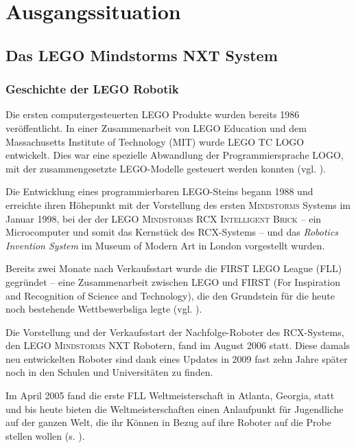 \documentclass[paper=a4, DIV=calc, BCOR=12mm, twoside=on, onecolumn=on, open = right, titlepage =on, parskip =half-, headsepline = on, footsepline = off, chapterprefix = off, appendixprefix = on, fontsize = 12pt, numbers = noenddot, abstract = on]{scrbook}
\begin{document}
\chapter{Ausgangssituation}

\par\singlespacing
\section{Das LEGO Mindstorms NXT System}
\onehalfspacing
\subsection{Geschichte der \textsc{LEGO} Robotik}
Die ersten computergesteuerten \textsc{LEGO} Produkte wurden bereits 1986 veröffentlicht. In einer Zusammenarbeit von \textsc{LEGO} Education und dem Massachusetts Institute of Technology (MIT) wurde \textsc{LEGO TC LOGO} entwickelt. Dies war eine spezielle Abwandlung der Programmiersprache LOGO, mit der zusammengesetzte \textsc{LEGO}-Modelle gesteuert werden konnten (vgl. \cite{rolling:14}).

Die Entwicklung eines programmierbaren \textsc{LEGO}-Steins begann 1988 und erreichte ihren Höhepunkt mit der Vorstellung des ersten \textsc{Mindstorms} Systems im Januar 1998, bei der der \textsc{LEGO Mindstorms RCX Intelligent Brick} -- ein Microcomputer und somit das Kernstück des RCX-Systems -- und das \emph{Robotics Invention System} im Museum of Modern Art in London vorgestellt wurden.

Bereits zwei Monate nach Verkaufsstart wurde die FIRST LEGO League (FLL) gegründet -- eine Zusammenarbeit zwischen \textsc{LEGO} und FIRST (For Inspiration and Recognition of Science and Technology), die den Grundstein für die heute noch bestehende Wettbewerbsliga legte (vgl. \cite{rolling:14}).

Die Vorstellung und der Verkaufsstart der Nachfolge-Roboter des RCX-Systems, den \textsc{LEGO Mindstorms} NXT Robotern, fand im August 2006 statt. Diese damals neu entwickelten Roboter sind dank eines Updates in 2009 fast zehn Jahre später noch in den Schulen und Universitäten zu finden. 

Im April 2005 fand die erste FLL Weltmeisterschaft in Atlanta, Georgia, statt und bis heute bieten die Weltmeisterschaften einen Anlaufpunkt für Jugendliche auf der ganzen Welt, die ihr Können in Bezug auf ihre Roboter auf die Probe stellen wollen (s. \cite{lego}).

\par \singlespacing
\end{document}
